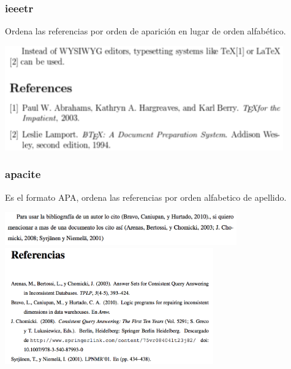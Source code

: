 \documentclass[aspectratio=43]{beamer}%
\begin{document}
\begin{frame}[fragile]
\frametitle{\textbf{ieeetr}}
\justifying
 Ordena las referencias por orden de aparición en lugar de orden alfabético.
 
 \begin{center}
\includegraphics[width=12cm]{images/ieeetr}
\end{center}

\end{frame}

\begin{frame}[fragile]
\frametitle{\textbf{apacite}}
\justifying
 Es el formato APA, ordena las referencias por orden alfabetico de apellido.
 
 \begin{center}
\includegraphics[width=10cm]{images/apacite}\\
\includegraphics[width=9cm]{images/aparef}
\end{center}

 
\end{frame}
\end{document}
